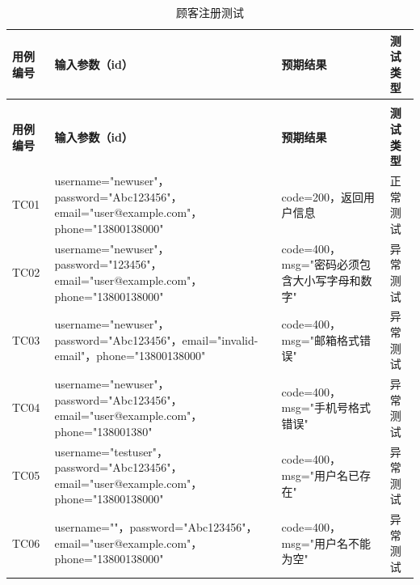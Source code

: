 \begin{levellist}
\begin{levellist}
\begin{itemize}
\begin{longtable}{>{\centering\arraybackslash}m{2cm} >{\centering\arraybackslash}m{5cm} >{\centering\arraybackslash}m{4cm} >{\centering\arraybackslash}m{2cm}}
                      \caption{顾客注册测试} \label{tab:training}                                                                                                                 \\

                      \toprule
                      \textbf{用例编号} & \textbf{输入参数（id）}                                                                     & \textbf{预期结果}                 & \textbf{测试类型} \\
                      \midrule
                      \endfirsthead

                      \multicolumn{4}{c}{{\tablename\ \thetable{} 续表}}                                                                                                      \\
                      \toprule
                      \textbf{用例编号} & \textbf{输入参数（id）}                                                                     & \textbf{预期结果}                 & \textbf{测试类型} \\
                      \midrule
                      \endhead

                      \bottomrule
                      \endfoot

                      TC01          & username="newuser"，password="Abc123456"，email="user@example.com"，phone="13800138000"  & code=200，返回用户信息               & 正常测试          \\
                      TC02          & username="newuser"，password="123456"，email="user@example.com"，phone="13800138000"     & code=400，msg="密码必须包含大小写字母和数字" & 异常测试          \\
                      TC03          & username="newuser"，password="Abc123456"，email="invalid-email"，phone="13800138000"     & code=400，msg="邮箱格式错误"         & 异常测试          \\
                      TC04          & username="newuser"，password="Abc123456"，email="user@example.com"，phone="138001380"    & code=400，msg="手机号格式错误"        & 异常测试          \\
                      TC05          & username="testuser"，password="Abc123456"，email="user@example.com"，phone="13800138000" & code=400，msg="用户名已存在"         & 异常测试          \\
                      TC06          & username=""，password="Abc123456"，email="user@example.com"，phone="13800138000"         & code=400，msg="用户名不能为空"        & 异常测试          \\
                  \end{longtable}
        \end{itemize}


\end{levellist}
\end{levellist}
